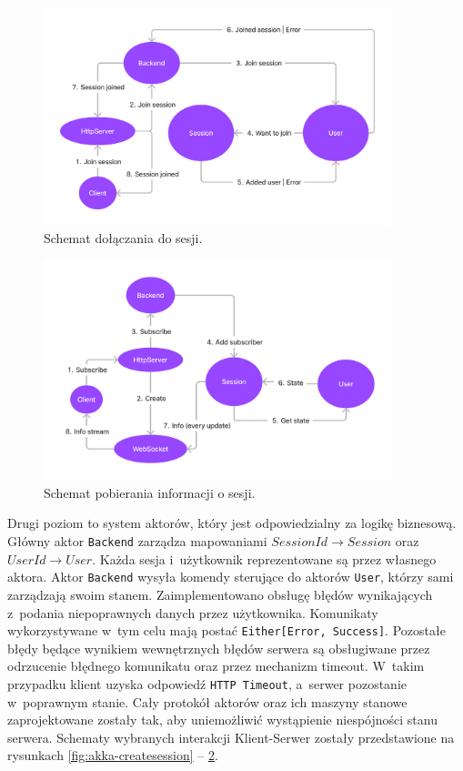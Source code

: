 \begin{figure}[hp!]
    \centering
    \includegraphics[width=0.9\textwidth]{img/akka/JoinSession.png}
    \caption{Schemat dołączania do sesji.}
    \label{fig:akka-joinsession}
\end{figure}

\begin{figure}[hp!]
    \centering
    \includegraphics[width=0.9\textwidth]{img/akka/SessionInfo.png}
    \caption{Schemat pobierania informacji o sesji.}
    \label{fig:akka-sessioninfo}
\end{figure}

Drugi poziom to system aktorów, który jest
odpowiedzialny za logikę biznesową.
Główny aktor \verb|Backend| zarządza mapowaniami
$SessionId \to Session$ oraz $UserId \to User$.
Każda sesja i~użytkownik reprezentowane są
przez własnego aktora.
Aktor \verb|Backend| wysyła komendy sterujące do
aktorów \verb|User|, którzy sami zarządzają swoim stanem.
Zaimplementowano obsługę błędów wynikających z~podania
niepoprawnych danych przez użytkownika.
Komunikaty wykorzystywane w~tym celu mają postać
\verb|Either[Error, Success]|.
Pozostałe błędy będące wynikiem wewnętrznych błędów
serwera są obsługiwane przez odrzucenie błędnego
komunikatu oraz przez mechanizm timeout.
W~takim przypadku klient uzyska odpowiedź
\verb|HTTP Timeout|, a~serwer pozostanie w~poprawnym stanie.
Cały protokół aktorów oraz ich maszyny stanowe zaprojektowane
zostały tak, aby uniemożliwić wystąpienie niespójności stanu serwera.
Schematy wybranych interakcji Klient-Serwer zostały przedstawione
na rysunkach \ref{fig:akka-createsession} -- \ref{fig:akka-sessioninfo}.

